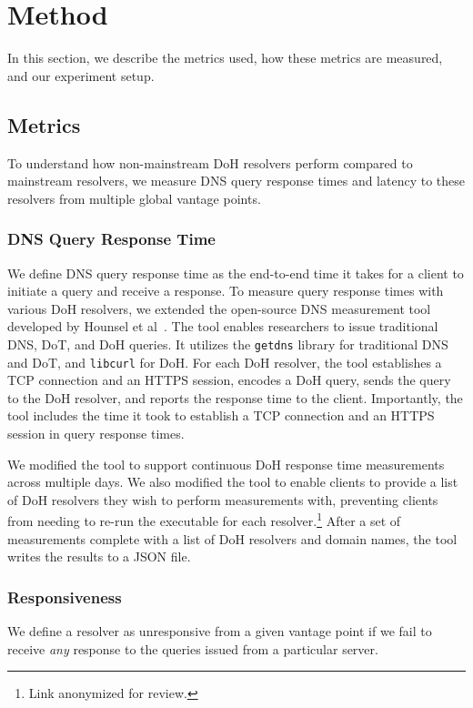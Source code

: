 \section{Method}\label{sec:method}
In this section, we describe the metrics used, how these metrics are measured, and our experiment setup.

\subsection{Metrics}
To understand how non-mainstream DoH resolvers perform compared to mainstream resolvers, we measure DNS query response times and latency to these resolvers from multiple global vantage points.

\subsubsection{DNS Query Response Time}
We define DNS query response time as the end-to-end time it takes for a client to initiate a query and receive a response.
To measure query response times with various DoH resolvers, we extended the open-source DNS measurement tool developed by Hounsel et al~\cite{hounsel2020comparing}.
The tool enables researchers to issue traditional DNS, DoT, and DoH queries.
It utilizes the \texttt{getdns} library for traditional DNS and DoT, and \texttt{libcurl} for DoH.
For each DoH resolver, the tool establishes a TCP connection and an HTTPS session, encodes a DoH query, sends the query to the DoH resolver, and reports the response time to the client.
Importantly, the tool includes the time it took to establish a TCP connection and an HTTPS session in query response times.

We modified the tool to support continuous DoH response time measurements across multiple days.
We also modified the tool to enable clients to provide a list of DoH resolvers they wish to perform measurements with, preventing clients from needing to re-run the executable for each resolver.\footnote{Link anonymized for review.}
After a set of measurements complete with a list of DoH resolvers and domain names, the tool writes the results to a JSON file.

\subsubsection{Responsiveness}
We define a resolver as unresponsive from a given vantage point if we fail to receive \emph{any} response to the queries issued from a particular server.

